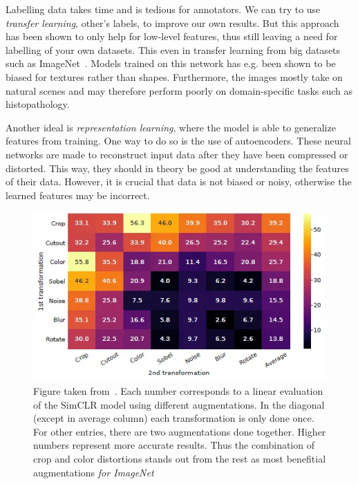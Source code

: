 \documentclass[10pt,twocolumn,letterpaper]{article}
\begin{document}
Labelling data takes time and is tedious for annotators. We can try to use \textit{transfer learning}, other's labels, to improve our own results. But this approach has been shown to only help for low-level features, thus still leaving a need for labelling of your own datasets. This even in transfer learning from big datasets such as ImageNet~\cite{imageNet}. Models trained on this network has e.g. been shown to be biased for textures rather than shapes. Furthermore, the images mostly take on natural scenes and may therefore perform poorly on domain-specific tasks such as histopathology.

Another ideal is \textit{representation learning}, where the model is able to generalize features from training. One way to do so is the use of autoencoders. These neural networks are made to reconstruct input data after they have been compressed or distorted. This way, they should in theory be good at understanding the features of their data. However, it is crucial that data is not biased or noisy, otherwise the learned features may be incorrect.

\begin{figure}
  \includegraphics[scale=.5]{simCLR.png}
  \caption{Figure taken from~\cite{simCLR}. Each number corresponds to a linear evaluation of the SimCLR model using different augmentations. In the diagonal (except in average column) each transformation is only done once. For other entries, there are two augmentations done together. Higher numbers represent more accurate results. Thus the combination of crop and color distortions stands out from the rest as most benefitial augmentations \textit{for ImageNet}}
\label{fig:simCLR}
\end{figure}
\end{document}
